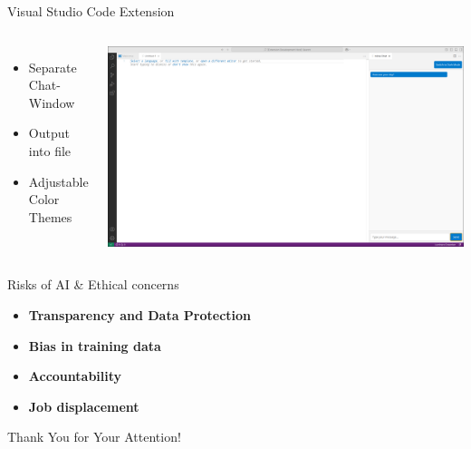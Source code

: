 \documentclass{beamer}
\begin{document}
\begin{frame}{Visual Studio Code Extension}
  \begin{columns}
      \begin{itemize}
        \item Separate Chat-Window
        \item Output into file
        \item Adjustable Color Themes
      \end{itemize}
      \centering
      \includegraphics[width=\textwidth]{VSCodeExtension.png}
  \end{columns}
\end{frame}

\begin{frame}{Risks of AI \& Ethical concerns}
  \begin{itemize}
    \item \textbf{Transparency and Data Protection}
    \item \textbf{Bias in training data}
    \item \textbf{Accountability}
    \item \textbf{Job displacement}
  \end{itemize}
\end{frame}

\begin{frame}[plain]
  
  \centering
  \vspace{1cm}
  \Huge Thank You for Your Attention!
\end{frame}
\end{document}
